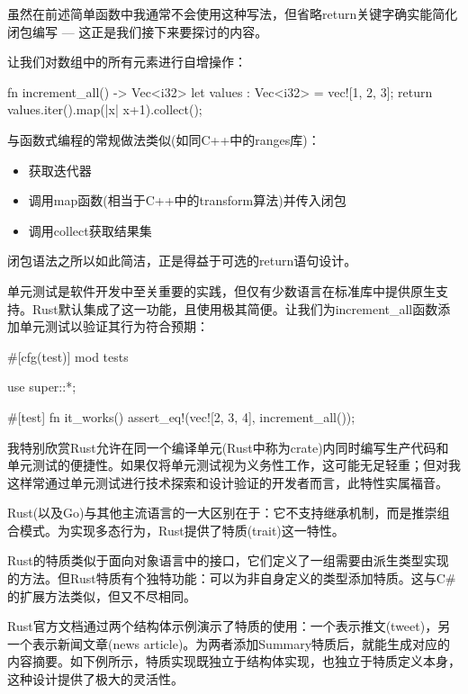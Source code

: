 虽然在前述简单函数中我通常不会使用这种写法，但省略return关键字确实能简化闭包编写 --- 这正是我们接下来要探讨的内容。


让我们对数组中的所有元素进行自增操作：

\begin{rust}
fn increment_all() -> Vec<i32>{
  let values : Vec<i32> = vec![1, 2, 3];
  return values.iter().map(|x| x+1).collect();
}
\end{rust}

与函数式编程的常规做法类似(如同C++中的ranges库)：

\begin{itemize}
\item 
获取迭代器

\item 
调用map函数(相当于C++中的transform算法)并传入闭包

\item 
调用collect获取结果集
\end{itemize}

闭包语法之所以如此简洁，正是得益于可选的return语句设计。


单元测试是软件开发中至关重要的实践，但仅有少数语言在标准库中提供原生支持。Rust默认集成了这一功能，且使用极其简便。让我们为increment\_all函数添加单元测试以验证其行为符合预期：

\begin{rust}
#[cfg(test)]
mod tests {
  use super::*;

  #[test]
  fn it_works() {
    assert_eq!(vec![2, 3, 4], increment_all());
  }
}
\end{rust}

我特别欣赏Rust允许在同一个编译单元(Rust中称为crate)内同时编写生产代码和单元测试的便捷性。如果仅将单元测试视为义务性工作，这可能无足轻重；但对我这样常通过单元测试进行技术探索和设计验证的开发者而言，此特性实属福音。


Rust(以及Go)与其他主流语言的一大区别在于：它不支持继承机制，而是推崇组合模式。为实现多态行为，Rust提供了特质(trait)这一特性。

Rust的特质类似于面向对象语言中的接口，它们定义了一组需要由派生类型实现的方法。但Rust特质有个独特功能：可以为非自身定义的类型添加特质。这与C\#的扩展方法类似，但又不尽相同。

Rust官方文档通过两个结构体示例演示了特质的使用：一个表示推文(tweet)，另一个表示新闻文章(news article)。为两者添加Summary特质后，就能生成对应的内容摘要。如下例所示，特质实现既独立于结构体实现，也独立于特质定义本身，这种设计提供了极大的灵活性。

